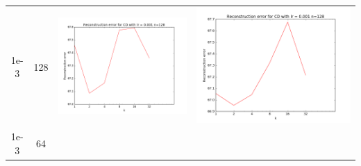 \documentclass[12pt]{report}
\begin{document}
\begin{table}[H]
\begin{tabular}{ | c | c | c | c |}
\begin{minipage}{.3\textwidth}
    \end{minipage}
    \\ \hline
    1e-3 & 128 &
    \begin{minipage}{.3\textwidth}
    \includegraphics[scale=0.25]{train_cd_lr_0_001_n_128.png}
    \end{minipage} &
    \begin{minipage}{.3\textwidth}
      \includegraphics[scale=0.25]{cd_lr_0_001_n_128.png}
    \end{minipage}
    \\ \hline
    1e-3 & 64 &
    \begin{minipage}{.3\textwidth}

\end{minipage}
\end{tabular}
\end{table}
\end{document}
